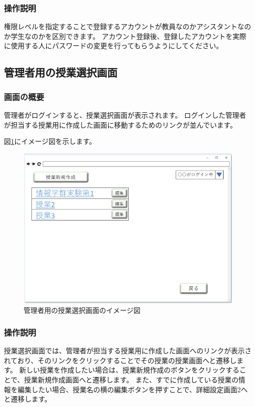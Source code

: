 \subsubsection{操作説明}
権限レベルを指定することで登録するアカウントが教員なのかアシスタントなのか学生なのかを区別できます。
アカウント登録後、登録したアカウントを実際に使用する人にパスワードの変更を行ってもらうようにしてください。

\newpage

\subsection{管理者用の授業選択画面}
\subsubsection{画面の概要}
管理者がログインすると、授業選択画面が表示されます。
ログインした管理者が担当する授業用に作成した画面に移動するためのリンクが並んでいます。

図\ref{fig:09}にイメージ図を示します。

\begin{figure}[htbp]
  \begin{center}
    \includegraphics[width=1\linewidth,clip]{./img/09.png}
    \caption{管理者用の授業選択画面のイメージ図}\label{fig:09}
  \end{center}
\end{figure}

\subsubsection{操作説明}
授業選択画面では、管理者が担当する授業用に作成した画面へのリンクが表示されており、そのリンクをクリックすることでその授業の授業画面へと遷移します。
新しい授業を作成したい場合は、授業新規作成のボタンをクリックすることで、授業新規作成画面へと遷移します。
また、すでに作成している授業の情報を編集したい場合、授業名の横の編集ボタンを押すことで、詳細設定画面2へと遷移します。


